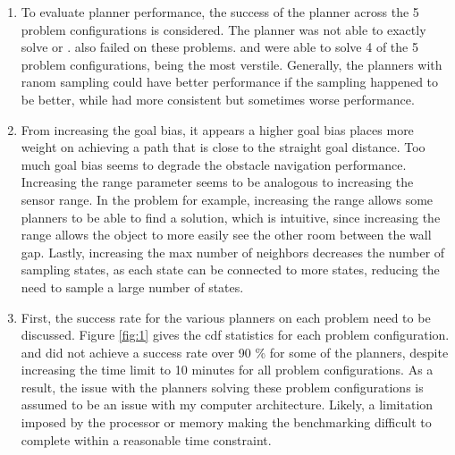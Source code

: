 \documentclass[11pt]{article}
\newcommand{\forceindent}{\leavevmode{\parindent=1em\indent}}
\begin{document}
\begin{enumerate}[leftmargin=0.3in]
\begin{enumerate}[leftmargin=0.3in]
   \end{enumerate}    
   
   \item %
   \begin{enumerate}[leftmargin=0.3in]
\forceindent To evaluate planner performance, the success of the planner across the 5 problem configurations is considered. The  planner was not able to exactly solve  or .  also failed on these problems.   and   were able to solve 4 of the 5 problem configurations, being the most verstile. Generally, the planners with ranom sampling could have better performance if the sampling happened to be better, while   had more consistent but sometimes worse performance. 
   \end{enumerate}    
   
   \item %
   \begin{enumerate}[leftmargin=0.3in]
\forceindent From increasing the goal bias, it appears a higher goal bias places more weight on achieving a path that is close to the straight goal distance. Too much goal bias seems to degrade the obstacle navigation performance. Increasing the range parameter seems to be analogous to increasing the sensor range. In the  problem for example, increasing the range allows some planners to be able to find a solution, which is intuitive, since increasing the range allows the object to more easily see the other room between the wall gap. Lastly, increasing the max number of neighbors decreases the number of sampling states, as each state can be connected to more states, reducing the need to sample a large number of states. 
   \end{enumerate}    
   
   \item %
   \begin{enumerate}[leftmargin=0.3in]
\forceindent First, the success rate for the various planners on each problem need to be discussed. Figure \ref{fig:1} gives the cdf statistics for each problem configuration.  and  did not achieve a success rate over 90 \% for some of the planners, despite increasing the time limit to 10 minutes for all problem configurations. As a result, the issue with the planners solving these problem configurations is assumed to be an issue with my computer architecture. Likely, a limitation imposed by the processor or memory making the benchmarking difficult to complete within a reasonable time constraint. 


\end{enumerate}
\end{enumerate}
\end{document}
